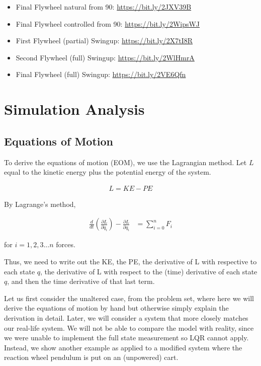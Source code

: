 \documentclass[conference]{IEEEtran}
\begin{document}
\begin{itemize}
    \item Final Flywheel natural from 90: \url{https://bit.ly/2JXV39B}
    \item Final Flywheel controlled from 90: \url{https://bit.ly/2WipsWJ}
    \item First Flywheel (partial) Swingup: \url{https://bit.ly/2X7tI8R}
    \item Second Flywheel (full) Swingup: \url{https://bit.ly/2WlHmrA}
    \item Final Flywheel (full) Swingup: \url{https://bit.ly/2VE6Qfn}
    
\end{itemize}


\section{Simulation Analysis}

\subsection{Equations of Motion}

To derive the equations of motion (EOM), we use the Lagrangian method. Let $L$
equal to the kinetic energy plus the potential energy of the system.


\begin{align}
    L = KE - PE
\end{align}

By Lagrange's method,

\begin{align}
    \frac{d}{dt} (\frac{\partial{L}}{\partial \dot{q}_i}) -
    \frac{\partial{L}}{\partial q_i}  &= \sum_{i=0}^{n} F_i
\end{align}

for $i = 1,2,3 ... n $ forces.

Thus, we need to write out the KE, the PE, the derivative of L with respective
to each state $q$, the derivative of L with respect to the (time) derivative of
each state $q$, and then the time derivative of that last term.

Let us first consider the unaltered case, from the problem set, where here we
will derive the equations of motion by hand but otherwise simply explain the
derivation in detail. Later, we will consider a system that more closely matches
our real-life system. We will not be able to compare the model with reality,
since we were unable to implement the full state measurement so LQR cannot
apply. Instead, we show another example as applied to a modified system where
the reaction wheel pendulum is put on an (unpowered) cart.
\end{document}
